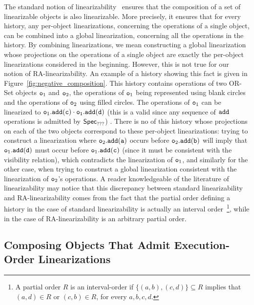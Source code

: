 The standard notion of linearizability~\cite{HerlihyW90} ensures that the composition of a set of linearizable objects is also linearizable. More precisely, it ensures that for every history, any per-object linearizations, concerning the operations of a single object, can be combined into a global linearization, concerning all the operations in the history. By combining linearizations, we mean constructing a global linearization whose projections on the operations of a single object are exactly the per-object linearizations considered in the beginning.
However, this is not true for our notion of RA-linearizability. An example of a history showing this fact is given in Figure~\ref{fig:negative_composition}. This history contains operations of two OR-Set objects $\mathtt{o}_1$ and $\mathtt{o}_2$, the operations of $\mathtt{o}_1$ being represented using blank circles and the operations of $\mathtt{o}_2$ using filled circles. The operations of $\mathtt{o}_1$ can be linearized to $\aobj_1.\alabelshort[{\tt add}]{c}\cdot \aobj_1.\alabelshort[{\tt add}]{d}$ (this is a valid \crdtlinearization{} since any sequence of ${\tt add}$ operations is admitted by $\mathsf{Spec}_{???}$) . There is no \crdtlinearization{} of this history whose projections on each of the two objects correspond to these per-object linearizations: trying to construct a linearization where $\aobj_2.\alabelshort[{\tt add}]{a}$ occurs before $\aobj_2.\alabelshort[{\tt add}]{b}$ will imply that $\aobj_1.\alabelshort[{\tt add}]{d}$ must occur before $\aobj_1.\alabelshort[{\tt add}]{c}$ (since it must be consistent with the visibility relation), which contradicts the linearization of $\mathtt{o}_1$, and similarly for the other case, when trying to construct a global linearization consistent with the linearization of $\mathtt{o}_2$'s operations. A reader knowledgeable of the literature of linearizability may notice that this discrepancy between standard linearizability and RA-linearizability comes from the fact that the partial order defining a history in the case of standard linearizability is actually an interval order~\footnote{A partial order $R$ is an interval-order if $\{(a,b), (c,d)\} \subseteq R$ implies that $(a,d) \in R$ or $(c,b) \in R$, for every $a,b,c,d$.}, while in the case of RA-linearizability is an arbitrary partial order.


\subsection{Composing Objects That Admit Execution-Order Linearizations}

